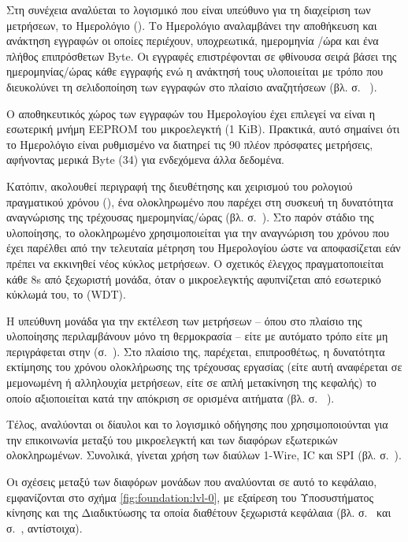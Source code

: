 Στη συνέχεια αναλύεται το λογισμικό που είναι υπεύθυνο για τη διαχείριση των
μετρήσεων, το Ημερολόγιο (\pageref{sec:log}). Το Ημερολόγιο αναλαμβάνει την
αποθήκευση και ανάκτηση εγγραφών οι οποίες περιέχουν, υποχρεωτικά, ημερομηνία%
\slash{}ώρα και ένα πλήθος επιπρόσθετων Byte. Οι εγγραφές επιστρέφονται σε
φθίνουσα σειρά βάσει της ημερομηνίας\slash{}ώρας κάθε εγγραφής ενώ η ανάκτησή
τους υλοποιείται με τρόπο που διευκολύνει τη σελιδοποίηση των εγγραφών στο
πλαίσιο αναζητήσεων (βλ.  σ.~%
\pageref{subsec:network:measurement}).

Ο αποθηκευτικός χώρος των εγγραφών του Ημερολογίου έχει επιλεγεί να είναι η
εσωτερική μνήμη EEPROM του μικροελεγκτή (1 KiB). Πρακτικά, αυτό σημαίνει ότι το
Ημερολόγιο είναι ρυθμισμένο να διατηρεί τις 90 πλέον πρόσφατες μετρήσεις,
αφήνοντας μερικά Byte (34) για ενδεχόμενα άλλα δεδομένα.

Κατόπιν, ακολουθεί περιγραφή της διευθέτησης και χειρισμού του ρολογιού
πραγματικού χρόνου (), ένα ολοκληρωμένο που παρέχει
στη συσκευή τη δυνατότητα αναγνώρισης της τρέχουσας ημερομηνίας\slash{}ώρας
(βλ.  σ.~\pageref{sec:rtc}). Στο παρόν στάδιο της υλοποίησης,
το ολοκληρωμένο χρησιμοποιείται για την αναγνώριση του χρόνου που έχει παρέλθει
από την τελευταία μέτρηση του Ημερολογίου ώστε να αποφασίζεται εάν πρέπει να
εκκινηθεί νέος κύκλος μετρήσεων. Ο σχετικός έλεγχος πραγματοποιείται κάθε 8s από
ξεχωριστή μονάδα, όταν ο μικροελεγκτής αφυπνίζεται από εσωτερικό κύκλωμά
του, το  (WDT).

Η υπεύθυνη μονάδα για την εκτέλεση των μετρήσεων -- όπου στο πλαίσιο της
υλοποίησης περιλαμβάνουν μόνο τη θερμοκρασία -- είτε με αυτόματο τρόπο είτε μη
περιγράφεται στην  (σ.~\pageref{sec:task}). Στο πλαίσιο της,
παρέχεται, επιπροσθέτως, η δυνατότητα εκτίμησης του χρόνου ολοκλήρωσης της
τρέχουσας εργασίας (είτε αυτή αναφέρεται σε μεμονωμένη ή αλληλουχία μετρήσεων,
είτε σε απλή μετακίνηση της κεφαλής) το οποίο αξιοποιείται κατά την απόκριση σε
ορισμένα αιτήματα (βλ.  σ.~%
\pageref{sec:network:impl-resources}).

Τέλος, αναλύονται οι δίαυλοι και το λογισμικό οδήγησης που χρησιμοποιούνται για
την επικοινωνία μεταξύ του μικροελεγκτή και των διαφόρων εξωτερικών
ολοκληρωμένων. Συνολικά, γίνεται χρήση των διαύλων 1-Wire, ΙC και SPI
(βλ.  σ.~\pageref{sec:buses}).

Οι σχέσεις μεταξύ των διαφόρων μονάδων που αναλύονται σε αυτό το κεφάλαιο,
εμφανίζονται στο σχήμα \ref{fig:foundation:lvl-0}, με εξαίρεση του Υποσυστήματος
κίνησης και της Διαδικτύωσης τα οποία διαθέτουν ξεχωριστά κεφάλαια (βλ.
σ.~\pageref{ch:motor} και σ.~\pageref{ch:network}, αντίστοιχα).

